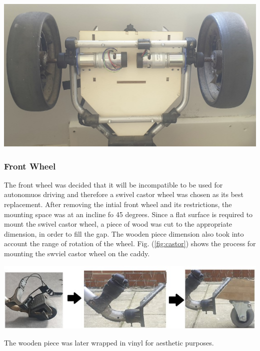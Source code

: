 \documentclass[11pt,landscape]{article}
\newenvironment{Figure}
  {\par\medskip\noindent\minipage{\linewidth}}
  {\endminipage\par\medskip}
\begin{document}
\begin{multicols}{2}
\begin{Figure}
    \begin{center}
        \includegraphics[width=\textwidth]{Figure27.jpg}
        \label{fig:auto}
    \end{center}
\end{Figure}


\subsubsection{Front Wheel}
The front wheel was decided that it will be incompatible to be used for
autonomuos driving and therefore a swivel castor wheel was chosen as its best
replacement. After removing the intial front wheel and its restrictions, the
mounting space was at an incline fo 45 degrees. Since a flat surface is required
to mount the swivel castor wheel, a piece of wood was cut to the appropriate
dimension, in order to fill the gap. The wooden piece dimension also took
into account the range of rotation of the wheel. Fig. (\ref{fig:castor}) shows
the process for mounting the swviel castor wheel on the caddy. 

\begin{Figure}
    \begin{center}
        \includegraphics[width=\textwidth]{Figure28.jpg}
        \label{fig:castor}
    \end{center}
\end{Figure}
The wooden piece was later wrapped in vinyl for aesthetic purposes.


\end{multicols}
\end{document}
